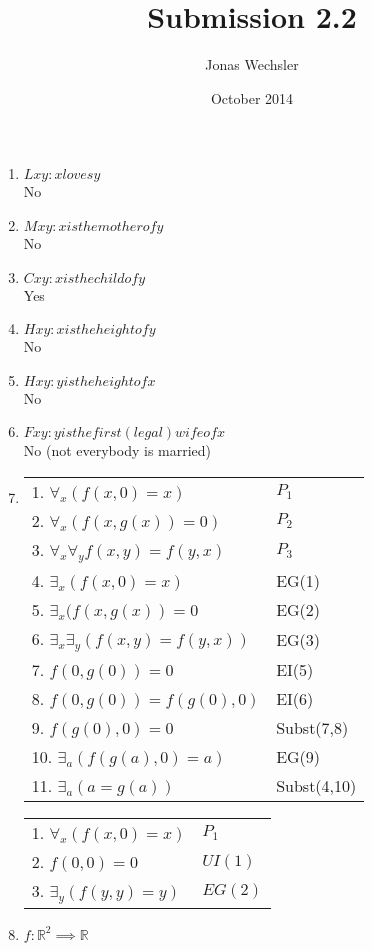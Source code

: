 \documentclass{article}
\title{Submission 2.2}
\author{Jonas Wechsler}
\date{October 2014}
\begin{document}
	\maketitle
	\begin{enumerate}
		\item
			$Lxy: x loves y$\\
			No
		\item
			$Mxy: x is the mother of y$\\
			No
		\item
			$Cxy: x is the child of y$\\
			Yes
		\item
			$Hxy: x is the height of y$\\
			No
		\item
			$Hxy: y is the height of x$\\
			No
		\item
			$Fxy: y is the first (legal) wife of x$\\
			No (not everybody is married)
		\item
			\begin{tabular}{l l}
				1. $\forall _x (f(x,0)=x)$ & $P_1$\\
				2. $\forall _x (f(x,g(x)) = 0)$ & $P_2$\\
				3. $\forall _x \forall _y f(x,y) = f(y,x)$ & $P_3$\\
				4. $\exists _x (f(x,0) = x)$ & EG(1)\\
				5. $\exists _x (f(x,g(x)) = 0$ & EG(2)\\
				6. $\exists _x \exists _y(f(x,y)=f(y,x))$ & EG(3)\\
				7. $f(0,g(0)) = 0$ & EI(5)\\
				8. $f(0,g(0)) = f(g(0),0)$ & EI(6)\\
				9. $f(g(0),0) = 0$ & Subst(7,8)\\
				10. $\exists _a (f(g(a),0) = a)$ & EG(9)\\
				11. $\exists _a (a = g(a))$ & Subst(4,10)\\
			\end{tabular}
			\begin{tabular}{l l}
				1. $\forall _x (f(x,0)=x)$ & $P_1$\\
				2. $f(0,0) = 0$ & $UI(1)$\\
				3. $\exists _y(f(y,y)=y)$ & $EG(2)$\\
			\end{tabular}
		\item
			$f:\mathbb{R}^2 \implies \mathbb{R}$\\

\end{enumerate}
\end{document}
